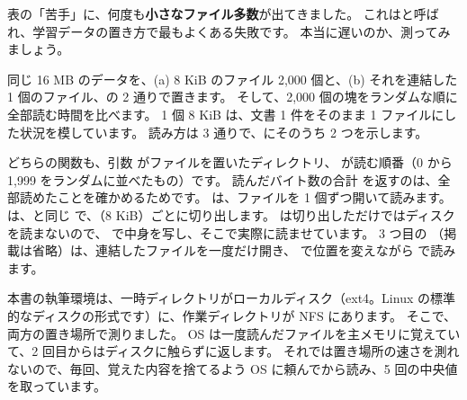 表の「苦手」に、何度も\textbf{小さなファイル多数}が出てきました。
これはと呼ばれ、学習データの置き方で最もよくある失敗です。
本当に遅いのか、測ってみましょう。

同じ 16 MB のデータを、(a) 8 KiB のファイル 2,000 個と、(b) それを連結した 1 個のファイル、の 2 通りで置きます。
そして、2,000 個の塊をランダムな順に全部読む時間を比べます。
1 個 8 KiB は、文書 1 件をそのまま 1 ファイルにした状況を模しています。
読み方は 3 通りで、にそのうち 2 つを示します。


どちらの関数も、引数  がファイルを置いたディレクトリ、 が読む順番（0 から 1,999 をランダムに並べたもの）です。
読んだバイト数の合計  を返すのは、全部読めたことを確かめるためです。
 は、ファイルを 1 個ずつ開いて読みます。
 は、と同じ  で、（8 KiB）ごとに切り出します。
 は切り出しただけではディスクを読まないので、 で中身を写し、そこで実際に読ませています。
3 つ目の （掲載は省略）は、連結したファイルを一度だけ開き、 で位置を変えながら  で読みます。

本書の執筆環境は、一時ディレクトリがローカルディスク（ext4。Linux の標準的なディスクの形式です）に、作業ディレクトリが NFS にあります。
そこで、両方の置き場所で測りました。
OS は一度読んだファイルを主メモリに覚えていて、2 回目からはディスクに触らずに返します。
それでは置き場所の速さを測れないので、毎回、覚えた内容を捨てるよう OS に頼んでから読み、5 回の中央値を取っています。


